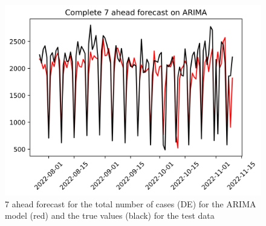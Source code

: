 \begin{figure}
\begin{minipage}{.32\textwidth}
  \label{fig:tot_cases_fc_7_ARIMA}
\end{minipage}
\begin{minipage}{.32\textwidth}
  \centering
  \includegraphics[width=\linewidth]{pics/7_ah/DE_Complete_7_ahead_ARIMA.png}
  \caption{7 ahead forecast for the total number of cases (DE) for the ARIMA model (red) and the true values (black) for the test data}
  \label{fig:tot_cases_fc_7_ARIMA_DE}
\end{minipage}

\end{figure}
